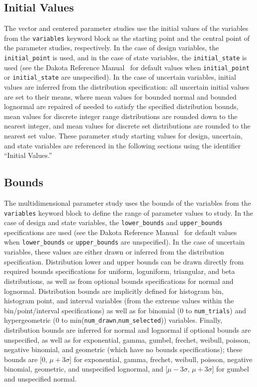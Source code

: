 \subsection{Initial Values}\label{ps:overview:initial}

The vector and centered parameter studies use the initial values of
the variables from the \texttt{variables} keyword block as the
starting point and the central point of the parameter studies,
respectively. In the case of design variables, the
\texttt{initial\_point} is used, and in the case of state variables, 
the \texttt{initial\_state} is used (see the Dakota Reference
Manual~\cite{RefMan} for default values when \texttt{initial\_point} or
\texttt{initial\_state} are unspecified). In the case of uncertain
variables, initial values are inferred from the distribution
specification: all uncertain initial values are set to their means,
where mean values for bounded normal and bounded lognormal are
repaired of needed to satisfy the specified distribution bounds, mean
values for discrete integer range distributions are rounded down to
the nearest integer, and mean values for discrete set distributions
are rounded to the nearest set value.  These parameter study starting
values for design, uncertain, and state variables are referenced in
the following sections using the identifier ``Initial Values.''

\subsection{Bounds}\label{ps:overview:bounds}

The multidimensional parameter study uses the bounds of the variables
from the \texttt{variables} keyword block to define the range of
parameter values to study. In the case of design and state variables,
the \texttt{lower\_bounds} and \texttt{upper\_bounds} specifications
are used (see the Dakota Reference Manual~\cite{RefMan} for default
values when \texttt{lower\_bounds} or \texttt{upper\_bounds} are
unspecified). In the case of uncertain variables, these values are
either drawn or inferred from the distribution specification.
Distribution lower and upper bounds can be drawn directly from
required bounds specifications for uniform, loguniform, triangular,
and beta distributions, as well as from optional bounds specifications
for normal and lognormal.  Distribution bounds are implicitly defined
for histogram bin, histogram point, and interval variables (from the
extreme values within the bin/point/interval specifications) as well
as for binomial (0 to \texttt{num\_trials}) and hypergeometric (0 to
min(\texttt{num\_drawn},\texttt{num\_selected})) variables.  Finally,
distribution bounds are inferred for normal and lognormal if optional
bounds are unspecified, as well as for exponential, gamma, gumbel,
frechet, weibull, poisson, negative binomial, and geometric (which
have no bounds specifications); these bounds are [0, $\mu + 3 \sigma$]
for exponential, gamma, frechet, weibull, poisson, negative binomial,
geometric, and unspecified lognormal, and [$\mu - 3\sigma$, 
$\mu + 3\sigma$] for gumbel and unspecified normal.


